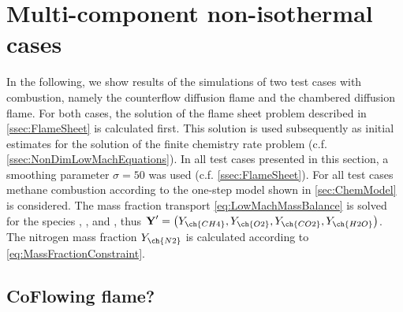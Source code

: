 {\section{Multi-component non-isothermal cases}\label{sec:MultCompNonIsothermCase}
In the following, we show results of the simulations of two test cases with combustion, namely the counterflow diffusion flame and the chambered diffusion flame. For both cases, the solution of the flame sheet problem described in \cref{ssec:FlameSheet} is calculated first. This solution is used subsequently as initial estimates for the solution of the finite chemistry rate problem (c.f. \cref{ssec:NonDimLowMachEquations}). In all test cases presented in this section, a smoothing parameter $\sigma = 50$ was used (c.f. \cref{ssec:FlameSheet}). For all test cases methane combustion according to the one-step model shown in \cref{sec:ChemModel} is considered. The mass fraction transport \cref{eq:LowMachMassBalance} is solved for the species , ,  and , thus $\vec{Y}' = \left(Y_{\ch{CH4}},Y_{\ch{O2}},Y_{\ch{CO2}},Y_{\ch{H2O}}\right)$. The nitrogen mass fraction $Y_{\ch{N2}}$ is calculated according to \cref{eq:MassFractionConstraint}. 



\subsection{CoFlowing flame?}

}
